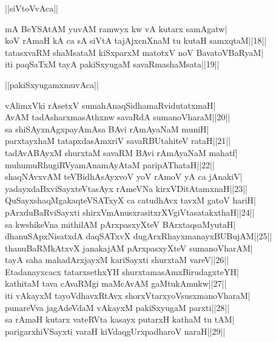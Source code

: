 \documentclass{article}
\begin{document}
\begin{center}
||siVtoVvAca||
\end{center}

mA BeYSAtAM yuvAM ramwyx kw vA kutarx samAgatw|\\
koV rAmaH kA ca sA siVtA tajAjxcnXnaM tu kutaH samxqtaM||18||\\
tatasxvaRM shaMsataM kiSxparxM matotxV noV BavatoVBaRyaM|\\
iti paqSaTxM tayA pakiSxyugaM savaRmashaMsata||19||\\

\begin{center}
||pakiSxyugamxmuvAca||
\end{center}

vAlimxVki rAsetxV sumahAnaqSidhamaRvidutatxmaH|\\
AvAM tadAsharxmasAthxnw savaRdA sumanoVharaM||20||\\
sa shiSAyxnAgxpayAmAsa BAvi rAmAyaNaM muniH|\\
parxtayxhaM tatapxdasAmxriV savaRBUtahiteV rataH||21||\\
tadAvABAyxM shurxtaM savaRM BAvi rAmAyaNaM mahatf|\\
muhumuRhugiRVyamAnamAyAtaM paripAThataH||22||\\
shaqNAvxvAM teVBidhAsAyxvoV yoV rAmoV yA ca jAnakiV|\\
yadayxdaBxviSayxteVtasAyx rAmeVNa kirxVDitAtamxnaH||23||\\
QuSayxshaqMgakaqteVSATxyX ca catudhAvx tavxM gatoV hariH|\\
pArxduBaRviSayxti shirxVmAnusxrasitxrXVgiVtasatakxthaH||24||\\
sa kwshikeVna mithilAM pArxpasxyXteV BArxtaqsaMyutaH|\\
dhanuSApxNisatxdA daqSATxvX dugArxRhayxmanayxBUBujAM||25||\\
thanuBaRMkAtxvX janakajAM pArxpasxyXteV sumanoVharAM|\\
tayA saha mahadArxjayxM kariSayxti shurxtaM vareV||26||\\
Etadanayxcacx tatarxsethxYH shurxtamasAmxBirudagxteYH|\\
kathitaM tava cAvaRMgi maMcAvAM gaMtukAmukw||27||\\
iti vAkayxM tayoVdhavxRtAvx shorxVtarxyoVsusxmanoVharaM|\\
punareVva jagAdeVdaM vAkayxM pakiSxyugaM parxti||28||\\
sa rAmaH kutarx vateRVta kasayx putarxH kathaM tu tAM|\\
parigarxhiVSayxti varaH kiVdaqgUrxpadharoV naraH||29||\\
\end{document}
